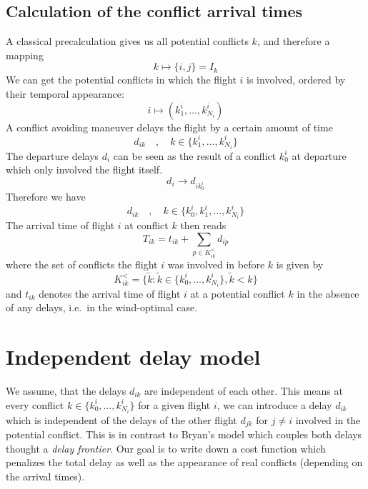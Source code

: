 \documentclass{article}
\begin{document}
\subsection{Calculation of the conflict arrival times}
A classical precalculation gives us all potential conflicts $k$, and therefore a mapping
\begin{equation*}
    k \mapsto \{i, j\} = I_k
\end{equation*}
We can get the potential conflicts in which the flight $i$ is involved, ordered by their temporal appearance:
\begin{equation*}
    i \mapsto (k^i_1, \dots, k^i_{N_i})
\end{equation*}
A conflict avoiding maneuver delays the flight by a certain amount of time
\begin{equation*}
    d_{ik} \quad, \quad  k\in\{k^i_1, \dots, k^i_{N_i}\}
\end{equation*}
The departure delays $d_i$ can be seen as the result of a conflict $k^i_0$ at departure which only involved the flight itself.
\begin{equation*}
    d_i \to d_{ik^i_0}
\end{equation*}
Therefore we have
\begin{equation*}
    d_{ik} \quad, \quad  k\in\{k^i_0, k^i_1, \dots, k^i_{N_i}\}
\end{equation*}
The arrival time of flight $i$ at conflict $k$ then reads
\begin{equation*}
    T_{ik} = t_{ik} + \sum_{p \in K^<_{ik}} d_{ip}
\end{equation*}
where the set of conflicts the flight $i$ was involved in before $k$ is given by
\begin{equation*}
    K^<_{ik} = \{\tilde k : \tilde k \in\{k^i_0, \dots, k^i_{N_i}\}, \tilde k < k\}
\end{equation*}
and $t_{ik}$ denotes the arrival time of flight $i$ at a potential conflict $k$ in the absence of any delays, i.e.\ in the wind-optimal case.

\section{Independent delay model}
We assume, that the delays $d_{ik}$ are independent of each other. 
This means at every conflict $k \in  \{k^i_0, \dots, k^i_{N_i}\}$ for a given flight $i$, we can introduce a delay $d_{ik}$ which is independent of the delays of the other flight $d_{jk}$ for $j\neq i$ involved in the potential conflict.
This is in contrast to Bryan's model which couples both delays thought a \textit{delay frontier}.
Our goal is to write down a cost function which penalizes the total delay as well as the appearance of real conflicts (depending on the arrival times).
\end{document}
